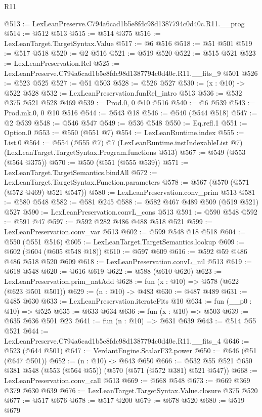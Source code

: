 \begin{lexlean}{R11}
\begin{coremodule}
@513 := LexLeanPreserve.C794a6cad1b5e8fdc98d1387794c0d40c.R11.__prog
@514 := @512 @513
@515 := @514 @375
@516 := LexLeanTarget.TargetSyntax.Value
@517 := @6 @516
@518 := @51 @501
@519 := @517 @518
@520 := @2 @516
@521 := @519 @520
@522 := @515 @521
@523 := LexLeanPreservation.Rel
@525 := LexLeanPreserve.C794a6cad1b5e8fdc98d1387794c0d40c.R11.__fits_9 @501
@526 := @523 @525
@527 := @51 @503
@528 := @526 @527
@530 := (x : @10) -> @522 @528
@532 := LexLeanPreservation.funRel_intro @513
@536 := @532 @375 @521 @528 @469
@539 := Prod.{0, 0} @10 @516
@540 := @6 @539
@543 := Prod.mk.{0, 0} @10 @516
@544 := @543 @18
@546 := @540 (@544 @518)
@547 := @2 @539
@548 := @546 @547
@549 := @536 @548
@550 := Eq.refl.{1}
@551 := Option.{0}
@553 := @550 (@551 @7)
@554 := LexLeanRuntime.index
@555 := List.{0}
@564 := @554
    (@555 @7)
    @7
    (LexLeanRuntime.instIndexableList @7)
    (LexLeanTarget.TargetSyntax.Program.functions @513)
@567 := @549 (@553 (@564 @375))
@570 := @550 (@551 (@555 @539))
@571 := LexLeanTarget.TargetSemantics.bindAll
@572 := LexLeanTarget.TargetSyntax.Function.parameters
@578 := @567 (@570 (@571 (@572 @469) @521 @547))
@580 := LexLeanPreservation.conv_prim @513
@581 := @580 @548
@582 := @581 @245
@588 := @582 @467 @489 @509 (@519 @521) @527
@590 := LexLeanPreservation.convL_cons @513
@591 := @590 @548
@592 := @591 @47
@597 := @592 @282 @486 @488 @518 @521
@599 := LexLeanPreservation.conv_var @513
@602 := @599 @548 @18 @518
@604 := @550 (@551 @516)
@605 := LexLeanTarget.TargetSemantics.lookup
@609 := @602 (@604 (@605 @548 @18))
@610 := @597 @609
@616 := @592 @59 @486 @486 @518 @520 @609
@618 := LexLeanPreservation.convL_nil @513
@619 := @618 @548
@620 := @616 @619
@622 := @588 (@610 @620)
@623 := LexLeanPreservation.prim_natAdd
@628 := fun (x : @10) => @578 (@622 (@623 @501 @501))
@629 := (n : @10) -> @483
@630 := @487 @489
@631 := @485 @630
@633 := LexLeanPreservation.iterateFits @10
@634 := fun (__p0 : @10) => @525
@635 := @633 @634
@636 := fun (x : @10) => @503
@639 := @635 @636 @501 @23
@641 := fun (n : @10) => @631 @639
@643 := @514 @55 @521
@644 := LexLeanPreserve.C794a6cad1b5e8fdc98d1387794c0d40c.R11.__fits_4
@646 := @523 (@644 @501)
@647 := VerdantEngine.ScalarF32.power
@650 := @646 (@51 (@647 @501))
@652 := (n : @10) -> @643 @650
@666 := @532 @55 @521 @650 @381 @548 (@553 (@564 @55)) (@570 (@571 (@572 @381) @521 @547))
@668 := LexLeanPreservation.conv_call @513
@669 := @668 @548
@673 := @669 @369 @379 @630 @639
@676 := LexLeanTarget.TargetSyntax.Value.closure @375 @520
@677 := @517 @676
@678 := @517 @200
@679 := @678 @520
@680 := @519 @679

\end{coremodule}
\end{lexlean}
